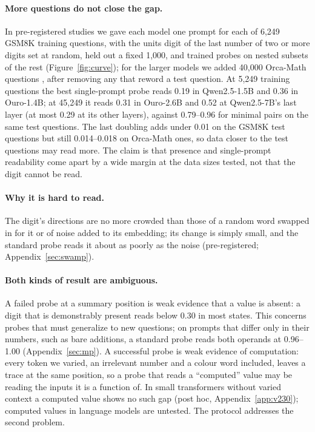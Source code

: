 \documentclass{article}
\begin{document}
\paragraph{More questions do not close the gap.}\label{sec:more} In pre-registered studies we gave each model one prompt for each of 6,249 GSM8K training questions, with the units digit of the last number of two or more digits set at random, held out a fixed 1,000, and trained probes on nested subsets of the rest (Figure~\ref{fig:curve}); for the larger models we added 40,000 Orca-Math questions \citep{mitra2024orcamath}, after removing any that reword a test question. At 5,249 training questions the best single-prompt probe reads 0.19 in Qwen2.5-1.5B and 0.36 in Ouro-1.4B; at 45,249 it reads 0.31 in Ouro-2.6B and 0.52 at Qwen2.5-7B's last layer (at most 0.29 at its other layers), against 0.79--0.96 for minimal pairs on the same test questions. The last doubling adds under 0.01 on the GSM8K test questions but still 0.014--0.018 on Orca-Math ones, so data closer to the test questions may read more. The claim is that presence and single-prompt readability come apart by a wide margin at the data sizes tested, not that the digit cannot be read.

\paragraph{Why it is hard to read.}\label{sec:small} The digit's directions are no more crowded than those of a random word swapped in for it or of noise added to its embedding; its change is simply small, and the standard probe reads it about as poorly as the noise (pre-registered; Appendix~\ref{sec:swamp}).

\paragraph{Both kinds of result are ambiguous.} A failed probe at a summary position is weak evidence that a value is absent: a digit that is demonstrably present reads below 0.30 in most states. This concerns probes that must generalize to new questions; on prompts that differ only in their numbers, such as bare additions, a standard probe reads both operands at 0.96--1.00 (Appendix~\ref{sec:mp}). A successful probe is weak evidence of computation: every token we varied, an irrelevant number and a colour word included, leaves a trace at the same position, so a probe that reads a ``computed'' value may be reading the inputs it is a function of. In small transformers without varied context a computed value shows no such gap (post hoc, Appendix~\ref{app:v230}); computed values in language models are untested. The protocol addresses the second problem.
\end{document}
